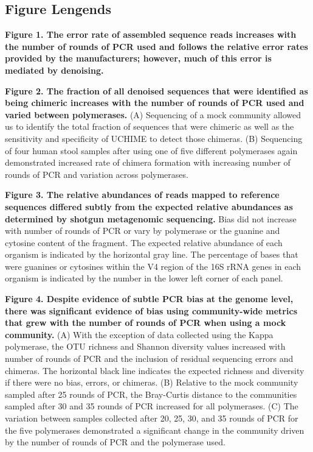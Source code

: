 \documentclass[11pt,]{article}
\begin{document}
\hypertarget{figure-lengends}{%
\subsection{Figure Lengends}\label{figure-lengends}}

\textbf{Figure 1. The error rate of assembled sequence reads increases
with the number of rounds of PCR used and follows the relative error
rates provided by the manufacturers; however, much of this error is
mediated by denoising.}

\textbf{Figure 2. The fraction of all denoised sequences that were
identified as being chimeric increases with the number of rounds of PCR
used and varied between polymerases.} (A) Sequencing of a mock community
allowed us to identify the total fraction of sequences that were
chimeric as well as the sensitivity and specificity of UCHIME to detect
those chimeras. (B) Sequencing of four human stool samples after using
one of five different polymerases again demonstrated increased rate of
chimera formation with increasing number of rounds of PCR and variation
across polymerases.

\textbf{Figure 3. The relative abundances of reads mapped to reference
sequences differed subtly from the expected relative abundances as
determined by shotgun metagenomic sequencing.} Bias did not increase
with number of rounds of PCR or vary by polymerase or the guanine and
cytosine content of the fragment. The expected relative abundance of
each organism is indicated by the horizontal gray line. The percentage
of bases that were guanines or cytosines within the V4 region of the 16S
rRNA genes in each organism is indicated by the number in the lower left
corner of each panel.

\textbf{Figure 4. Despite evidence of subtle PCR bias at the genome
level, there was significant evidence of bias using community-wide
metrics that grew with the number of rounds of PCR when using a mock
community.} (A) With the exception of data collected using the Kappa
polymerase, the OTU richness and Shannon diversity values increased with
number of rounds of PCR and the inclusion of residual sequencing errors
and chimeras. The horizontal black line indicates the expected richness
and diversity if there were no bias, errors, or chimeras. (B) Relative
to the mock community sampled after 25 rounds of PCR, the Bray-Curtis
distance to the communities sampled after 30 and 35 rounds of PCR
increased for all polymerases. (C) The variation between samples
collected after 20, 25, 30, and 35 rounds of PCR for the five
polymerases demonstrated a significant change in the community driven by
the number of rounds of PCR and the polymerase used.
\end{document}
